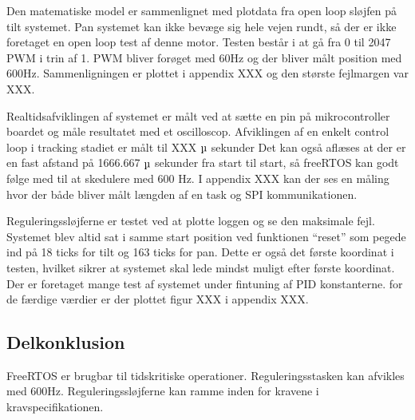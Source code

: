 Den matematiske model er sammenlignet med plotdata fra open loop sløjfen på tilt systemet.
Pan systemet kan ikke bevæge sig hele vejen rundt, så der er ikke foretaget en open loop test af denne motor.
Testen består i at gå fra 0 til 2047 PWM i trin af 1. PWM bliver forøget med 60Hz og der bliver målt position med 600Hz.
Sammenligningen er plottet i appendix XXX og den største fejlmargen var XXX.


Realtidsafviklingen af systemet er målt ved at sætte en pin på mikrocontroller boardet og måle resultatet med et oscilloscop.
Afviklingen af en enkelt control loop i tracking stadiet er målt til XXX \(\micro\) sekunder
Det kan også aflæses at der er en fast afstand på 1666.667 \(\micro\) sekunder fra start til start, så freeRTOS kan godt følge med til at skedulere med 600 Hz.
I appendix XXX kan der ses en måling hvor der både bliver målt længden af en task og SPI kommunikationen.


Reguleringssløjferne er testet ved at plotte loggen og se den maksimale fejl.
Systemet blev altid sat i samme start position ved funktionen ``reset'' som pegede ind på 18 ticks for tilt og 163 ticks for pan.
Dette er også det første koordinat i testen, hvilket sikrer at systemet skal lede mindst muligt efter første koordinat.
Der er foretaget mange test af systemet under fintuning af PID konstanterne.
for de færdige værdier er der plottet figur XXX i appendix XXX.



\subsection{Delkonklusion}
FreeRTOS er brugbar til tidskritiske operationer.
Reguleringsstasken kan afvikles med 600Hz. 
Reguleringssløjferne kan ramme inden for kravene i kravspecifikationen.
